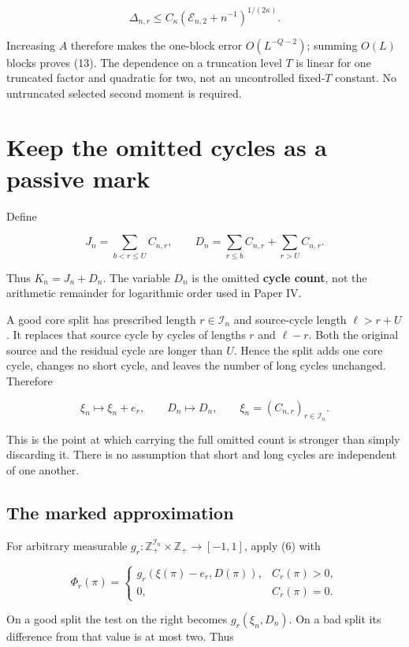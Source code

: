 \documentclass[
  11pt,
]{article}
\begin{document}
\[
 \Delta_{n,r}\le C_\kappa(\mathcal E_{n,2}+n^{-1})^{1/(2\kappa)}.
\]

Increasing \(A\) therefore makes the one-block error \(O(L^{-Q-2})\);
summing \(O(L)\) blocks proves (13). The dependence on a truncation
level \(T\) is linear for one truncated factor and quadratic for two,
not an uncontrolled fixed-\(T\) constant. No untruncated selected second
moment is required.

\section{Keep the omitted cycles as a passive
mark}\label{keep-the-omitted-cycles-as-a-passive-mark}

Define

\[
 J_n=\sum_{b<r\le U}C_{n,r},\qquad
 D_n=\sum_{r\le b}C_{n,r}+\sum_{r>U}C_{n,r}.
\tag{14}
\]

Thus \(K_n=J_n+D_n\). The variable \(D_n\) is the omitted \textbf{cycle
count}, not the arithmetic remainder for logarithmic order used in Paper
IV.

A good core split has prescribed length \(r\in\mathcal I_n\) and
source-cycle length \(\ell>r+U\). It replaces that source cycle by
cycles of lengths \(r\) and \(\ell-r\). Both the original source and the
residual cycle are longer than \(U\). Hence the split adds one core
cycle, changes no short cycle, and leaves the number of long cycles
unchanged. Therefore

\[
 \xi_n\longmapsto\xi_n+e_r,\qquad D_n\longmapsto D_n,
 \qquad \xi_n=(C_{n,r})_{r\in\mathcal I_n}.
\tag{15}
\]

This is the point at which carrying the full omitted count is stronger
than simply discarding it. There is no assumption that short and long
cycles are independent of one another.

\subsection{The marked approximation}\label{the-marked-approximation}

For arbitrary measurable
\(g_r:\mathbb Z_+^{\mathcal I_n}\times\mathbb Z_+\to[-1,1]\), apply (6)
with

\[
 \Phi_r(\pi)=
 \begin{cases}
 g_r(\xi(\pi)-e_r,D(\pi)),&C_r(\pi)>0,\\
 0,&C_r(\pi)=0.
 \end{cases}
\]

On a good split the test on the right becomes \(g_r(\xi_n,D_n)\). On a
bad split its difference from that value is at most two. Thus
\end{document}
